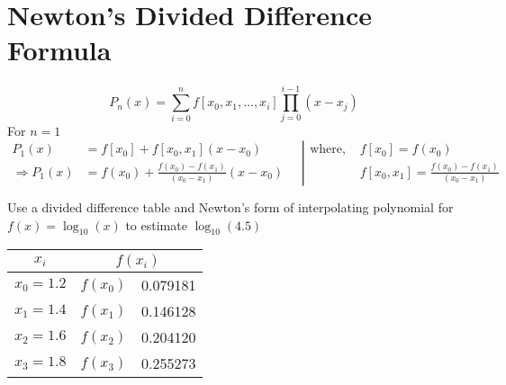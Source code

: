 \documentclass[12pt,class=book,crop=false]{standalone}
\begin{document}
\section{Newton's Divided Difference Formula}
\[P_n(x)=\sum_{i=0}^nf[x_0,x_1,\dots,x_i]\prod_{j=0}^{i-1}(x-x_j)\]
For \(  n=1 \)
\[
    \left.\begin{aligned}
        P_1(x)             & =f[x_0]+f[x_0,x_1](x-x_0)                      \\
        \Rightarrow P_1(x) & =f(x_0)+\frac{f(x_0)-f(x_1)}{(x_0-x_1)}(x-x_0)
    \end{aligned}\quad\right\vert\begin{aligned}
        \text{where, } & f[x_0]=f(x_0)                               \\
                       & f[x_0,x_1] =\frac{f(x_0)-f(x_1)}{(x_0-x_1)}
    \end{aligned}
\]
\begin{prob}
    Use a divided difference table and Newton's form of interpolating polynomial for \(  f(x)=\log_{10}(x) \) to estimate \(  \log_{10}(4.5) \)
    \begin{center}
        \begin{tabular}{cr@{ = }S[table-format=2.6]}
            \toprule
            \(  x_i \) &           \\\midrule
            \(  x_0=1.2 \) & \(  f(x_0)\)&0.079181  \\
            \(  x_1=1.4 \) & \(  f(x_1)\)&0.146128  \\
            \(  x_2=1.6 \) & \(  f(x_2)\)&0.204120  \\
            \(  x_3=1.8 \) & \(  f(x_3)\)&0.255273  \\\bottomrule
        \end{tabular}
    \end{center}
\end{prob}
\end{document}
